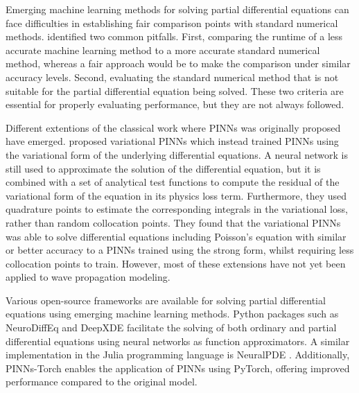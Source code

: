 \documentclass[11pt,twoside]{article}
\begin{document}
Emerging machine learning methods for solving partial differential equations can face difficulties in establishing fair comparison points 
with standard numerical methods. \citeauthor{mcgreivy_weak_2024} identified two common pitfalls. First, comparing the runtime of a less 
accurate machine learning method to a more accurate standard numerical method, whereas a fair approach would be to make the comparison under 
similar accuracy levels. Second, evaluating the standard numerical method that is not suitable for the partial differential equation being 
solved. These two criteria are essential for properly evaluating performance, but they are not always followed. 
 
Different extentions of the classical work where PINNs was originally proposed have emerged.  
proposed variational PINNs which instead trained PINNs using the variational form of the 
underlying differential equations. A neural network is still used to approximate the solution of the differential equation, but it is combined 
with a set of analytical test functions to compute the residual of the variational form of the equation in its physics loss term. Furthermore, 
they used quadrature points to estimate the corresponding integrals in the variational loss, rather than random collocation points. They found 
that the variational PINNs was able to solve differential equations including Poisson’s equation with similar or 
better accuracy to a PINNs trained using the strong form, whilst requiring less collocation points to train. 
However, most of these extensions have not yet been applied to wave propagation modeling.

Various open-source frameworks are available for solving partial differential equations using emerging machine learning methods. Python 
packages such as NeuroDiffEq \citep{chen2020neurodiffeq} and DeepXDE \citep{lu2021deepxde} facilitate the solving of both ordinary and 
partial differential equations using neural networks as function approximators. A similar implementation in the Julia programming language 
is NeuralPDE \citep{https://doi.org/10.48550/arxiv.2107.09443}. Additionally, PINNs-Torch \citep{bafghi_pinns-torch_2023} enables the 
application of PINNs using PyTorch, offering improved performance compared to the original model.

\end{document}
